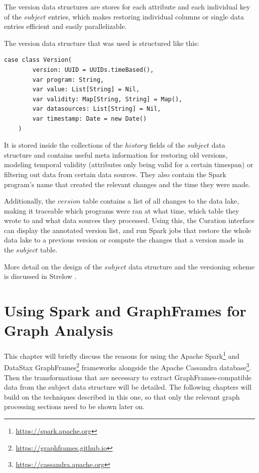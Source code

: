 \documentclass[
        a4paper,     %
        titlepage,   %
        oneside,     %
        parskip      %
]{scrartcl}          %
\begin{document}
    The version data structures are stores for each attribute and each individual
    key of the $subject$ entries, which makes restoring individual columns or single
    data entries efficient and easily parallelizable.

    The version data structure that was used is structured like this:
    \begin{lstlisting}[style=scalaStyle,caption=Version]
    case class Version(
    	version: UUID = UUIDs.timeBased(),
    	var program: String,
    	var value: List[String] = Nil,
    	var validity: Map[String, String] = Map(),
    	var datasources: List[String] = Nil,
    	var timestamp: Date = new Date()
    )
    \end{lstlisting}

    It is stored inside the collections of the $history$ fields of the $subject$
    data structure and contains useful meta information for restoring old versions,
    modeling temporal validity (attributes only being valid for a certain timespan)
    or filtering out data from certain data sources. They also contain the Spark
    program's name that created the relevant changes and the time they were made.

    Additionally, the $version$ table contains a list of all changes to the data lake,
    making it traceable which programs were ran at what time, which table they wrote
    to and what data sources they processed. Using this, the Curation interface
    can display the annotated version list, and run Spark jobs that restore the
    whole data lake to a previous version or compute the changes that a version
    made in the $subject$ table.

    More detail on the design of the $subject$ data structure and the versioning
    scheme is discussed in Strelow \cite{strelow}.
    \pagebreak

  \section{Using Spark and GraphFrames for Graph Analysis}
  This chapter will briefly discuss the reasons for using the
  Apache Spark\footnote{\url{https://spark.apache.org}}
  and DataStax GraphFrames\footnote{\url{https://graphframes.github.io}}
  frameworks alongside the
  Apache Cassandra database\footnote{\url{https://cassandra.apache.org}}.
  Then the transformations that are necessary to extract GraphFrames-compatible
  data from the subject data structure will be detailed.
  The following chapters will build on the techniques described in this one, so
  that only the relevant graph processing sections need to be shown later on.
\end{document}
